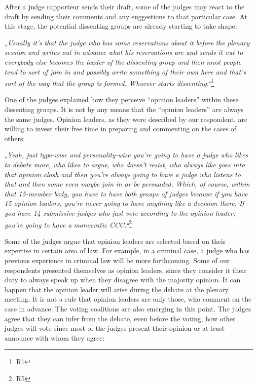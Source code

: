 \documentclass[
  11pt,
]{article}
\begin{document}
After a judge rapporteur sends their draft, some of the judges may react to the draft by sending their comments and any suggestions to that particular case. At this stage, the potential dissenting groups are already starting to take shape:

\emph{„Usually it's that the judge who has some reservations about it before the plenary session and writes out in advance what his reservations are and sends it out to everybody else becomes the leader of the dissenting group and then most people tend to sort of join in and possibly write something of their own here and that's sort of the way that the group is formed. Whoever starts dissenting.``}\footnote{R1}

One of the judges explained how they perceive ``opinion leaders'' within these dissenting groups. It is not by any means that the ``opinion leaders'' are always the same judges. Opinion leaders, as they were described by our respondent, are willing to invest their free time in preparing and commenting on the cases of others:

\emph{„Yeah, just type-wise and personality-wise you're going to have a judge who likes to debate more, who likes to argue, who doesn't resist, who always like goes into that opinion clash and then you're always going to have a judge who listens to that and then some even maybe join in or be persuaded. Which, of course, within that 15-member body, you have to have both groups of judges because if you have 15 opinion leaders, you're never going to have anything like a decision there. If you have 14 submissive judges who just vote according to the opinion leader, you're going to have a monocratic CCC.``}\footnote{R5}

Some of the judges argue that opinion leaders are selected based on their expertise in certain area of law. For example, in a criminal case, a judge who has previous experience in criminal law will be more forthcoming. Some of our respondents presented themselves as opinion leaders, since they consider it their duty to always speak up when they disagree with the majority opinion. It can happen that the opinion leader will arise during the debate at the plenary meeting. It is not a rule that opinion leaders are only those, who comment on the case in advance. The voting coalitions are also emerging in this point. The judges agree that they can infer from the debate, even before the voting, how other judges will vote since most of the judges present their opinion or at least announce with whom they agree:
\end{document}
